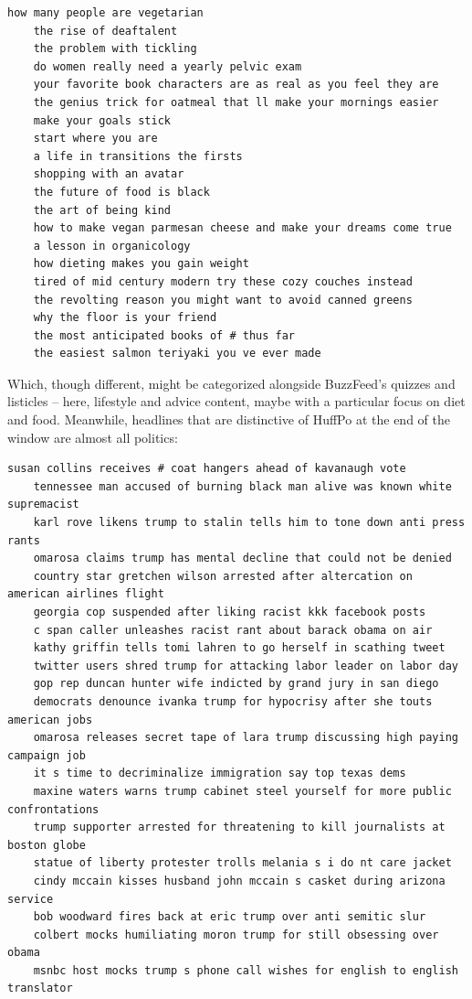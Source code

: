 \documentclass{scrartcl}
\begin{document}
\begin{lstlisting}[basicstyle=\tiny\hlfont]
    how many people are vegetarian
    the rise of deaftalent
    the problem with tickling
    do women really need a yearly pelvic exam
    your favorite book characters are as real as you feel they are
    the genius trick for oatmeal that ll make your mornings easier
    make your goals stick
    start where you are
    a life in transitions the firsts
    shopping with an avatar
    the future of food is black
    the art of being kind
    how to make vegan parmesan cheese and make your dreams come true
    a lesson in organicology
    how dieting makes you gain weight
    tired of mid century modern try these cozy couches instead
    the revolting reason you might want to avoid canned greens
    why the floor is your friend
    the most anticipated books of # thus far
    the easiest salmon teriyaki you ve ever made
\end{lstlisting}

Which, though different, might be categorized alongside BuzzFeed's quizzes and listicles -- here, lifestyle and advice content, maybe with a particular focus on diet and food. Meanwhile, headlines that are distinctive of HuffPo at the end of the window are almost all politics:

\begin{lstlisting}[basicstyle=\tiny\hlfont]
    susan collins receives # coat hangers ahead of kavanaugh vote
    tennessee man accused of burning black man alive was known white supremacist
    karl rove likens trump to stalin tells him to tone down anti press rants
    omarosa claims trump has mental decline that could not be denied
    country star gretchen wilson arrested after altercation on american airlines flight
    georgia cop suspended after liking racist kkk facebook posts
    c span caller unleashes racist rant about barack obama on air
    kathy griffin tells tomi lahren to go herself in scathing tweet
    twitter users shred trump for attacking labor leader on labor day
    gop rep duncan hunter wife indicted by grand jury in san diego
    democrats denounce ivanka trump for hypocrisy after she touts american jobs
    omarosa releases secret tape of lara trump discussing high paying campaign job
    it s time to decriminalize immigration say top texas dems
    maxine waters warns trump cabinet steel yourself for more public confrontations
    trump supporter arrested for threatening to kill journalists at boston globe
    statue of liberty protester trolls melania s i do nt care jacket
    cindy mccain kisses husband john mccain s casket during arizona service
    bob woodward fires back at eric trump over anti semitic slur
    colbert mocks humiliating moron trump for still obsessing over obama
    msnbc host mocks trump s phone call wishes for english to english translator
\end{lstlisting}
\end{document}
